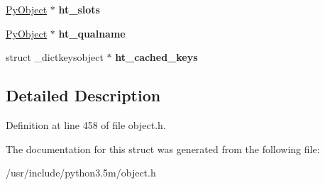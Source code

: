 \begin{DoxyCompactItemize}
\item 
\hyperlink{struct__object}{Py\+Object} $\ast$ {\bfseries ht\+\_\+slots}\hypertarget{struct__heaptypeobject_a576c6533321ab6cb92b6d114d1a5c641}{}\label{struct__heaptypeobject_a576c6533321ab6cb92b6d114d1a5c641}

\item 
\hyperlink{struct__object}{Py\+Object} $\ast$ {\bfseries ht\+\_\+qualname}\hypertarget{struct__heaptypeobject_a54d0feb235f4a9554be26a5804940553}{}\label{struct__heaptypeobject_a54d0feb235f4a9554be26a5804940553}

\item 
struct \+\_\+dictkeysobject $\ast$ {\bfseries ht\+\_\+cached\+\_\+keys}\hypertarget{struct__heaptypeobject_a375c2bd2b6ef99213823e0f089160994}{}\label{struct__heaptypeobject_a375c2bd2b6ef99213823e0f089160994}

\end{DoxyCompactItemize}


\subsection{Detailed Description}


Definition at line 458 of file object.\+h.



The documentation for this struct was generated from the following file\+:\begin{DoxyCompactItemize}
\item 
/usr/include/python3.\+5m/object.\+h\end{DoxyCompactItemize}
